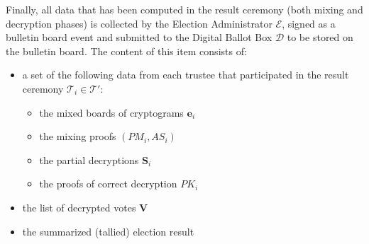 Finally, all data that has been computed in the result ceremony (both mixing and decryption phases) is collected by the Election Administrator $\mathcal{E}$, signed as a bulletin board event and submitted to the Digital Ballot Box $\mathcal{D}$ to be stored on the bulletin board. The content of this item consists of:
\begin{itemize}
    \item a set of the following data from each trustee that participated in the result ceremony $\mathcal{T}_i \in \boldsymbol{\mathcal{T}'}$:
    \begin{itemize}
        \item the mixed boards of cryptograms $\boldsymbol{e}_i$
        \item the mixing proofs $(PM_i, AS_i)$
        \item the partial decryptions $\boldsymbol{S}_i$
        \item the proofs of correct decryption $PK_i$
    \end{itemize}
    \item the list of decrypted votes $\boldsymbol{V}$
    \item the summarized (tallied) election result
\end{itemize}
